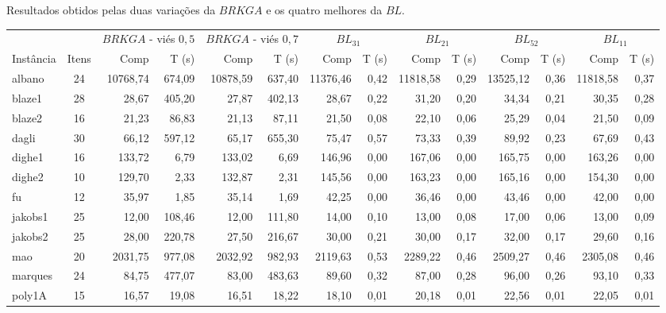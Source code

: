 \documentclass{article}
\newcommand{\lgray}{\cellcolor{lightgray}}
\begin{document}
\begin{adjustwidth}{-2.5 cm}{-2.5 cm}\centering\begin{threeparttable}[!htb]
\renewcommand{\arraystretch}{1.2}%
    \caption{Resultados obtidos pelas duas variações da $BRKGA$ e os quatro melhores da $BL$.}
    \scriptsize{
    \begin{tabular}{|l|c|rr|rr|rr|rr|rr|rr|}\hline
        \multicolumn{1}{|c|}{} & \multicolumn{1}{c|}{} &\multicolumn{2}{c|}{$BRKGA$ - viés $0,5$} &\multicolumn{2}{c|}{$BRKGA$ - viés $0,7$} &\multicolumn{2}{c|}{$BL_{31}$} &\multicolumn{2}{c|}{$BL_{21}$} &\multicolumn{2}{c|}{$BL_{52}$} &\multicolumn{2}{c|}{$BL_{11}$} \\
        Instância & Itens &Comp &T (s) &Comp &T (s) &Comp &T (s) &Comp &T (s) &Comp &T (s) &Comp &T (s) \\\hline
        albano &24 &\lgray10768,74 &674,09 &10878,59 &637,40 &11376,46 &0,42 &11818,58 &0,29 &13525,12 &0,36 &11818,58 &0,37 \\
        blaze1 &28 &28,67 &405,20 &\lgray27,87 &402,13 &28,67 &0,22 &31,20 &0,20 &34,34 &0,21 &30,35 &0,28 \\
        blaze2 &16 &21,23 &86,83 &\lgray21,13 &87,11 &21,50 &0,08 &22,10 &0,06 &25,29 &0,04 &21,50 &0,09 \\
        dagli &30 &66,12 &597,12 &\lgray65,17 &655,30 &75,47 &0,57 &73,33 &0,39 &89,92 &0,23 &67,69 &0,43 \\
        dighe1 &16 &133,72 &6,79 &\lgray133,02 &6,69 &146,96 &0,00 &167,06 &0,00 &165,75 &0,00 &163,26 &0,00 \\
        dighe2 &10 &\lgray129,70 &2,33 &132,87 &2,31 &145,56 &0,00 &163,23 &0,00 &165,16 &0,00 &154,30 &0,00 \\
        fu &12 &35,97 &1,85 &\lgray35,14 &1,69 &42,25 &0,00 &36,46 &0,00 &43,46 &0,00 &42,00 &0,00 \\
        jakobs1 &25 &\lgray12,00 &108,46 &\lgray12,00 &111,80 &14,00 &0,10 &13,00 &0,08 &17,00 &0,06 &13,00 &0,09 \\
        jakobs2 &25 &28,00 &220,78 &\lgray27,50 &216,67 &30,00 &0,21 &30,00 &0,17 &32,00 &0,17 &29,60 &0,16 \\
        mao &20 &\lgray2031,75 &977,08 &2032,92 &982,93 &2119,63 &0,53 &2289,22 &0,46 &2509,27 &0,46 &2305,08 &0,46 \\
        marques &24 &84,75 &477,07 &\lgray83,00 &483,63 &89,60 &0,32 &87,00 &0,28 &96,00 &0,26 &93,10 &0,33 \\
        poly1A &15 &16,57 &19,08 &\lgray16,51 &18,22 &18,10 &0,01 &20,18 &0,01 &22,56 &0,01 &22,05 &0,01 \\

\end{tabular}}
\end{threeparttable}
\end{adjustwidth}
\end{document}
